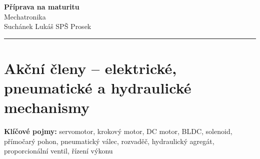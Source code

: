 \documentclass[a4paper,10pt]{article}
\begin{document}
\begin{minipage}[t]{0.75\textwidth}
    {\Huge\bfseries\color{accent} Příprava na maturitu}\\[4pt]
    {\large\color{stripeblue} Mechatronika}\\[2pt]
    \textcolor{medgray}{\small Suchánek Lukáš \quad SPŠ Prosek }
\end{minipage}
\hfill
\begin{minipage}[t]{0.22\textwidth}
    \raggedleft
\end{minipage}

\vspace{6pt}
\noindent\color{accent}\rule{\linewidth}{1.5pt}
\vspace{2pt}

\section{Akční členy -- elektrické, pneumatické a hydraulické mechanismy}

\begin{pojmybox}
\textbf{Klíčové pojmy:}
servomotor, krokový motor, DC motor, BLDC, solenoid,
přímočarý pohon, pneumatický válec, rozvaděč, hydraulický agregát,
proporcionální ventil, řízení výkonu
\end{pojmybox}
\end{document}
